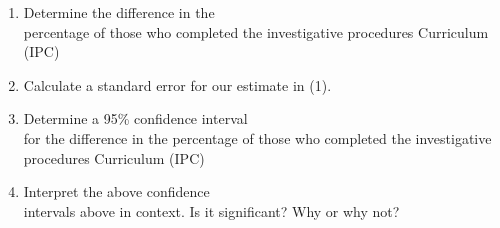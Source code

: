 \documentclass[11pt, chapterprefix=true]{scrbook}\usepackage[]{graphicx}\usepackage[]{color}
\begin{document}
\begin{exercises}
\begin{exercise}
\begin{enumerate}
\item Determine the difference in the \\ percentage of those who completed the investigative procedures Curriculum \\ (IPC)

\item Calculate a standard error for our estimate in (1).

\item Determine a 95\% confidence interval \\ for the difference in the percentage of those who completed the investigative procedures Curriculum (IPC)

\item Interpret the above confidence \\ intervals above in context.  Is it significant? Why or why not?


\end{enumerate}

	\end{exercise}
%
%
%


\end{exercises}
\end{document}
